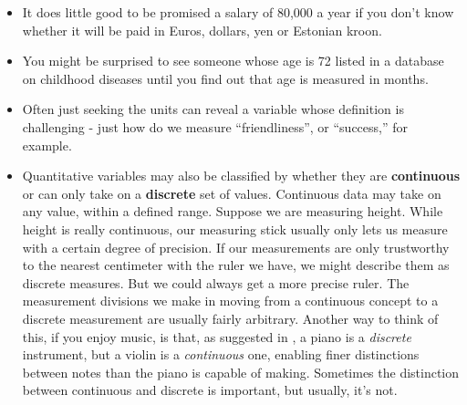 \documentclass[
]{book}
\begin{document}
\begin{itemize}
\item
  It does little good to be promised a salary of 80,000 a year if you don't know whether it will be paid in Euros, dollars, yen or Estonian kroon.
\item
  You might be surprised to see someone whose age is 72 listed in a database on childhood diseases until you find out that age is measured in months.
\item
  Often just seeking the units can reveal a variable whose definition is challenging - just how do we measure ``friendliness'', or ``success,'' for example.
\item
  Quantitative variables may also be classified by whether they are \textbf{continuous} or can only take on a \textbf{discrete} set of values. Continuous data may take on any value, within a defined range. Suppose we are measuring height. While height is really continuous, our measuring stick usually only lets us measure with a certain degree of precision. If our measurements are only trustworthy to the nearest centimeter with the ruler we have, we might describe them as discrete measures. But we could always get a more precise ruler. The measurement divisions we make in moving from a continuous concept to a discrete measurement are usually fairly arbitrary. Another way to think of this, if you enjoy music, is that, as suggested in \citet{Norman-Streiner}, a piano is a \emph{discrete} instrument, but a violin is a \emph{continuous} one, enabling finer distinctions between notes than the piano is capable of making. Sometimes the distinction between continuous and discrete is important, but usually, it's not.


\end{itemize}
\end{document}
